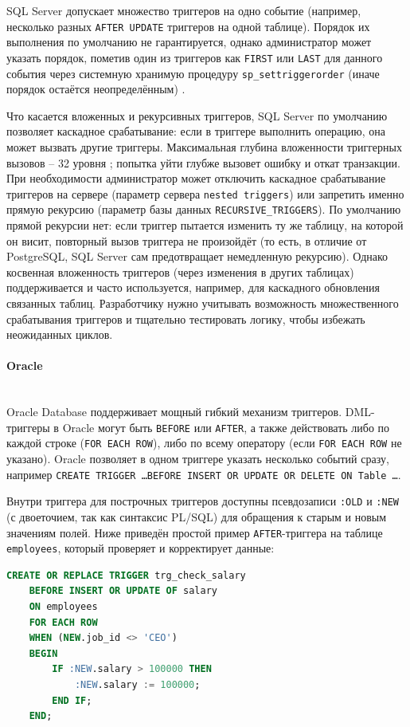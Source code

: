 SQL Server допускает множество триггеров на одно событие (например, несколько разных \texttt{AFTER UPDATE} триггеров на одной таблице). Порядок их выполнения по умолчанию не гарантируется, однако администратор может указать порядок, пометив один из триггеров как \texttt{FIRST} или \texttt{LAST} для данного события через системную хранимую процедуру \texttt{sp\_settriggerorder} (иначе порядок остаётся неопределённым) \autocite{MicrosoftLearnDDLTrig}.

Что касается вложенных и рекурсивных триггеров, SQL Server по умолчанию позволяет каскадное срабатывание: если в триггере выполнить операцию, она может вызвать другие триггеры. Максимальная глубина вложенности триггерных вызовов – 32 уровня  \autocite{MicrosoftLearnNestTrig}; попытка уйти глубже вызовет ошибку и откат транзакции. При необходимости администратор может отключить каскадное срабатывание триггеров на сервере (параметр сервера \texttt{nested triggers}) или запретить именно прямую рекурсию (параметр базы данных \texttt{RECURSIVE\_TRIGGERS}). По умолчанию прямой рекурсии нет: если триггер пытается изменить ту же таблицу, на которой он висит, повторный вызов триггера не произойдёт (то есть, в отличие от PostgreSQL, SQL Server сам предотвращает немедленную рекурсию). Однако косвенная вложенность триггеров (через изменения в других таблицах) поддерживается и часто используется, например, для каскадного обновления связанных таблиц. Разработчику нужно учитывать возможность множественного срабатывания триггеров и тщательно тестировать логику, чтобы избежать неожиданных циклов.

\paragraph{\textbf{Oracle}} ~\\

 Oracle Database поддерживает мощный гибкий механизм триггеров. DML-триггеры в Oracle могут быть \texttt{BEFORE} или \texttt{AFTER}, а также действовать либо по каждой строке (\texttt{FOR EACH ROW}), либо по всему оператору (если \texttt{FOR EACH ROW} не указано). Oracle позволяет в одном триггере указать несколько событий сразу, например \texttt{CREATE TRIGGER \ldots BEFORE INSERT OR UPDATE OR DELETE ON Table \ldots}. 
 
 Внутри триггера для построчных триггеров доступны псевдозаписи \texttt{:OLD} и \texttt{:NEW} (с двоеточием, так как синтаксис PL/SQL) для обращения к старым и новым значениям полей. Ниже приведён простой пример \texttt{AFTER}-триггера на таблице \texttt{employees}, который проверяет и корректирует данные:
 \begin{lstlisting}[language=SQL]
    CREATE OR REPLACE TRIGGER trg_check_salary
    BEFORE INSERT OR UPDATE OF salary
    ON employees
    FOR EACH ROW
    WHEN (NEW.job_id <> 'CEO')
    BEGIN
        IF :NEW.salary > 100000 THEN
            :NEW.salary := 100000;
        END IF;
    END;
 \end{lstlisting}

